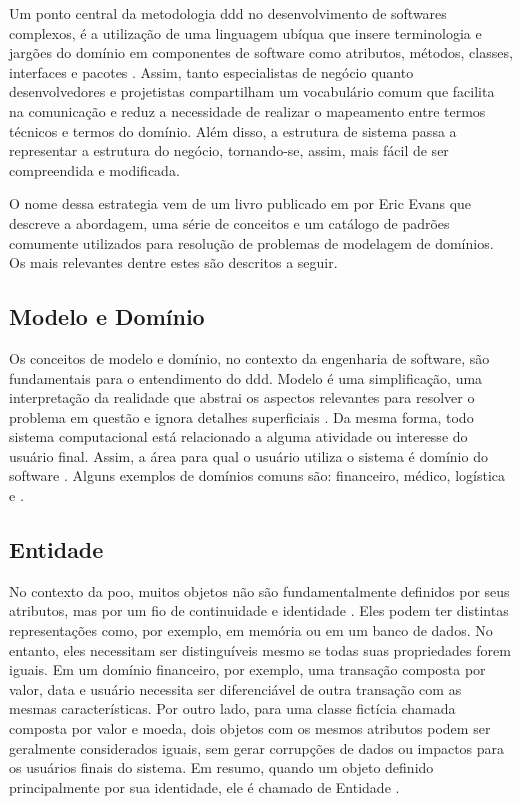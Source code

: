 Um ponto central da metodologia \acrshort{ddd} no desenvolvimento de softwares complexos, é a utilização de uma linguagem ubíqua que insere terminologia e jargões do domínio em componentes de software como atributos, métodos, classes, interfaces e pacotes \cite{dddFowler}. Assim, tanto especialistas de negócio quanto desenvolvedores e projetistas compartilham um vocabulário comum que facilita na comunicação e reduz a necessidade de realizar o mapeamento entre termos técnicos e termos do domínio. Além disso, a estrutura de sistema passa a representar a estrutura do negócio, tornando-se, assim, mais fácil de ser compreendida e modificada.

O nome dessa estrategia vem de um livro publicado em \citeyear{evans2004ddd} por Eric Evans que descreve a abordagem, uma série de conceitos e um catálogo de  padrões comumente utilizados para resolução de problemas de modelagem de domínios. Os mais relevantes dentre estes são descritos a seguir.

\subsection{Modelo e Domínio}
Os conceitos de modelo e domínio, no contexto da engenharia de software, são fundamentais para o entendimento do \acrshort{ddd}. Modelo é uma simplificação, uma interpretação da realidade que abstrai os aspectos relevantes para resolver o problema em questão e ignora detalhes superficiais \cite{evans2004ddd}. Da mesma forma, todo sistema computacional está relacionado a alguma atividade ou interesse do usuário final. Assim, a área para qual o usuário utiliza o sistema é domínio do software \cite{evans2004ddd}. Alguns exemplos de domínios comuns são: financeiro, médico, logística e .

\subsection{Entidade}
No contexto da \acrfull{poo}, muitos objetos não são fundamentalmente definidos por seus atributos, mas por um fio de continuidade e identidade \cite{evans2004ddd}. Eles podem ter distintas representações como, por exemplo, em memória ou em um banco de dados. No entanto, eles necessitam ser distinguíveis mesmo se todas suas propriedades forem iguais. Em um domínio financeiro, por exemplo, uma transação composta por valor, data e usuário necessita ser diferenciável de outra transação com as mesmas características. Por outro lado, para uma classe fictícia chamada  composta por valor e moeda, dois objetos com os mesmos atributos podem ser geralmente considerados iguais, sem gerar corrupções de dados ou impactos para os usuários finais do sistema. Em resumo, quando um objeto definido principalmente por sua identidade, ele é chamado de Entidade \cite{evans2004ddd}.

